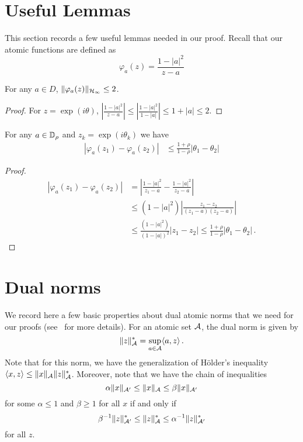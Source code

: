 \begin{subappendices}

\section{Useful Lemmas} This section records a few useful lemmas needed in our proof.  Recall that our atomic functions are defined as
\[
	\varphi_a(z) = \frac{1-|a|^2}{z-a}
\]

\begin{lemma}\label{lemma:atom-hinf}
For any $a \in D$, 	$\|\varphi_a(z)\|_{\mathcal{H}_\infty} \leq 2$.
\end{lemma}
\begin{proof}
For $z = \exp(i\theta)$,	$|\frac{1-|a|^2}{z-a}|  \leq |\frac{1-|a|^2}{1-|a|}|  \leq 1+|a| \leq 2$.
\end{proof}

\begin{lemma}  \label{lemma:atom-lipschitz}
For any $a \in \mathbb{D}_\rho$ and $z_k=\exp(i\theta_k)$ we have 
\begin{align}
\label{eq:vary-freqs} |\varphi_a(z_1) - \varphi_a(z_2)| &\leq \frac{1+\rho}{1-\rho} |\theta_1-\theta_2|
\end{align}
\end{lemma}

\begin{proof}
\begin{align*}
|\varphi_a(z_1) - \varphi_a(z_2)|
& =   \left|\frac{1-|a|^2}{z_1-a}-\frac{1-|a|^2}{z_2-a}\right|\\
&\leq (1-|a|^2) \left|\frac{z_1-z_2}{(z_1-a)(z_2-a)} \right|\\
&\leq \frac{(1-|a|^2)}{(1-|a|)^2} |z_1-z_2| \leq \frac{1+\rho}{1-\rho} |\theta_1-\theta_2|\,.
\end{align*}
\end{proof}

\section{Dual norms}
We record here a few basic properties about dual atomic norms that we need for our proofs (see~\cite{crpw,btr12} for more details).  For an atomic set $\mathcal{A}$, the dual norm is given by
\[
	\| z \|_{\mathcal{A}}^* = \sup_{a \in \mathcal{A}} \langle a, z \rangle\,.
\] 
Note that for this norm, we have the generalization of H\"{o}lder's inequality $\langle x,z\rangle \leq \|x\|_{\mathcal{A}}\|z\|_{\mathcal{A}}^*$.  Moreover, note that we have the chain of inequalities
\[
	 \alpha \|x\|_{\mathcal{A}'} \leq \|x\|_{\mathcal{A}} \leq \beta\|x\|_{\mathcal{A}'}
\]
for some $\alpha\leq 1$ and $\beta\geq 1$ for all $x$ if and only if
\[
	 \beta^{-1} \|z\|_{\mathcal{A}'}^* \leq \|z\|_{\mathcal{A}}^* \leq \alpha^{-1}\|z\|_{\mathcal{A}'}^*
\]
for all $z$.  


\end{subappendices}
